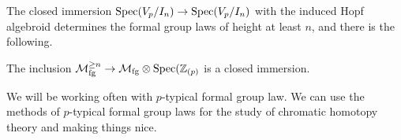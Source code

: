     The closed immersion $\operatorname{\mathrm{Spec}}(V_p/I_n)\to \operatorname{\mathrm{Spec}}(V_p/I_n)$ with the induced Hopf algebroid determines the formal group laws of height at least $n$, and there is the following.
\begin{corollary}
    The inclusion $\mathcal{M}_{\mathrm{fg}}^{\geq n}\to \mathcal{M}_{\mathrm{fg}}\otimes \operatorname{\mathrm{Spec}}(\mathbb{Z}_{(p)}$ is a closed immersion.
\end{corollary}

\begin{remark}
    We will be working often with $p$-typical formal group law. We can use the methods of $p$-typical formal group laws for the study of chromatic homotopy theory and making things nice. 
\end{remark}